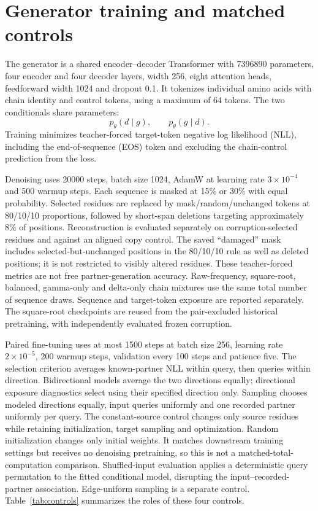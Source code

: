 \documentclass[a4paper,11pt]{article}
\begin{document}
\section{Generator training and matched controls}
The generator is a shared encoder--decoder Transformer with 7396890 parameters,
four encoder and four decoder layers, width 256, eight attention heads,
feedforward width 1024 and dropout 0.1. It tokenizes individual amino acids with
chain identity and control tokens, using a maximum of 64 tokens. The two
conditionals share parameters:
\begin{equation}
p_\theta(d\mid g),\qquad p_\theta(g\mid d).
\end{equation}
Training minimizes teacher-forced target-token negative log likelihood (NLL),
including the end-of-sequence (EOS) token and excluding the chain-control
prediction from the loss.

Denoising uses 20000 steps, batch size 1024, AdamW at learning rate
$3\times10^{-4}$ and 500 warmup steps. Each sequence is masked at 15\% or 30\%
with equal probability. Selected residues are replaced by mask/random/unchanged
tokens at 80/10/10 proportions, followed by short-span deletions targeting
approximately 8\% of positions. Reconstruction is evaluated separately on
corruption-selected residues and against an aligned copy control. The saved
``damaged'' mask includes selected-but-unchanged positions in the 80/10/10 rule
as well as deleted positions; it is not restricted to visibly altered residues.
These teacher-forced
metrics are not free partner-generation accuracy. Raw-frequency, square-root,
balanced, gamma-only and delta-only chain mixtures use the same total number of
sequence draws. Sequence and target-token exposure are reported separately.
The square-root checkpoints are reused from the pair-excluded historical
pretraining, with independently evaluated frozen corruption.

Paired fine-tuning uses at most 1500 steps at batch size 256, learning rate
$2\times10^{-5}$, 200 warmup steps, validation every 100 steps and patience five.
The selection criterion averages known-partner NLL within query, then queries
within direction. Bidirectional models average the two directions equally;
directional exposure diagnostics select using their specified direction only.
Sampling chooses modeled directions equally, input queries uniformly and one
recorded partner uniformly per query.
The constant-source control changes only source residues while retaining
initialization, target sampling and optimization. Random initialization changes only initial weights. It matches downstream
training settings but receives no denoising pretraining, so this is not a
matched-total-computation comparison. Shuffled-input evaluation applies a
deterministic query permutation to the fitted conditional model, disrupting the
input--recorded-partner association. Edge-uniform sampling is a separate control.
Table~\ref{tab:controls} summarizes the roles of these four controls.
\end{document}

